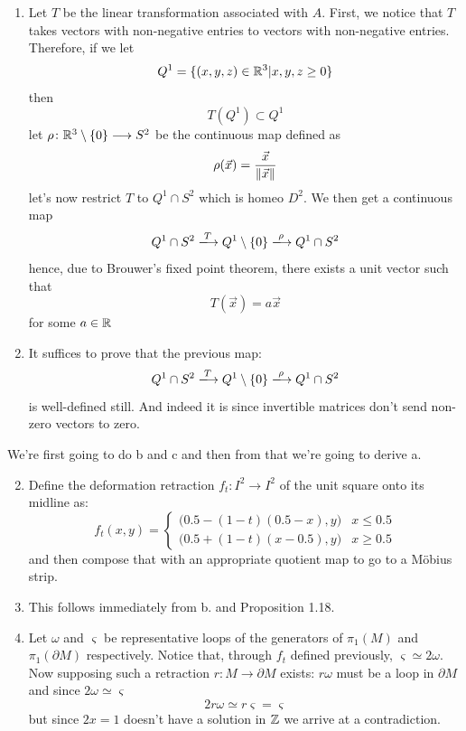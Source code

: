 \documentclass{article}
\begin{document}
\begin{homeworkProblem}
    \begin{enumerate}
        \item Let $T$ be the linear transformation associated with $A$. First, we notice that $T$ takes vectors with non-negative entries to vectors with non-negative entries. Therefore, if we let
        \[Q^1 = \{(x, y, z)\in\mathbb{R}^3|x,y,z\geq 0\}\]
        then
        \[T(Q^1) \subset Q^1\]
        let $\rho\colon \mathbb{R}^3\setminus \{0\}\longrightarrow S^2$ be the continuous map defined as
        \[\rho(\vec{x}) = \frac{\vec{x}}{\norm{\vec{x}}}\]
        let's now restrict $T$ to $Q^1 \cap S^2$ which is homeo $D^2$. We then get a continuous map
        \[Q^1 \cap S^2 \xlongrightarrow{T} Q^1 \setminus \{0\} \xlongrightarrow{\rho} Q^1 \cap S^2\]
        hence, due to Brouwer's fixed point theorem, there exists a unit vector such that
        \[T(\vec{x}) = a\vec{x}\]
        for some $a\in\mathbb{R}$
        
        \item It suffices to prove that the previous map:
        \[Q^1 \cap S^2 \xlongrightarrow{T} Q^1 \setminus \{0\} \xlongrightarrow{\rho} Q^1 \cap S^2\]
        is well-defined still. And indeed it is since invertible matrices don't send non-zero vectors to zero.
    \end{enumerate}
\end{homeworkProblem}
\begin{homeworkProblem}
    We're first going to do b and c and then from that we're going to derive a.
    \begin{enumerate}
        \setcounter{enumi}{1}
        \item Define the deformation retraction $f_t:I^2 \to I^2$ of the unit square onto its midline as:
        \[f_t(x, y) = 
        \begin{cases}
            \big(0.5 - (1-t)(0.5-x), y\big) & x \leq 0.5 \\
            \big(0.5 + (1-t)(x-0.5), y\big) & x \geq 0.5 
        \end{cases}
        \]
        and then compose that with an appropriate quotient map to go to a Möbius strip.

        \item This follows immediately from b. and Proposition 1.18.
        \setcounter{enumi}{0}
        \item Let $\omega$ and $\varsigma$ be representative loops of the generators of $\pi_1(M)$ and $\pi_1(\partial M)$ respectively. Notice that, through $f_t$ defined previously, $\varsigma \simeq 2\omega$. Now supposing such a retraction $r\colon M\to\partial M$ exists: $r\omega$ must be a loop in $\partial M$ and since $2\omega \simeq \varsigma$ 
        \[2r\omega\simeq r\varsigma = \varsigma\]
        but since $2x=1$ doesn't have a solution in $\mathbb{Z}$ we arrive at a contradiction.
    \end{enumerate}
\end{homeworkProblem}
\end{document}
